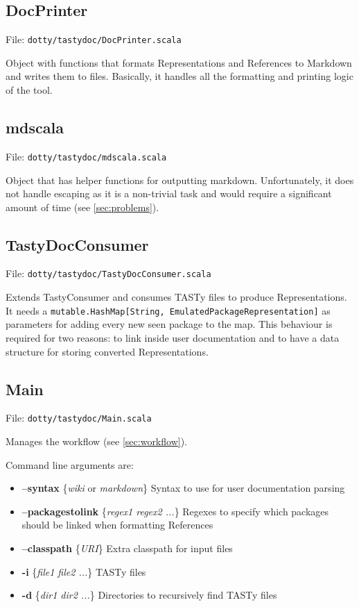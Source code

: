 \documentclass{report}
\begin{document}
\subsection{DocPrinter}
File: \texttt{dotty/tastydoc/DocPrinter.scala}

Object with functions that formats Representations and References to Markdown and writes them to files. Basically, it handles all the formatting and printing logic of the tool.

\subsection{mdscala}
File: \texttt{dotty/tastydoc/mdscala.scala}

Object that has helper functions for outputting markdown. Unfortunately, it does not handle escaping as it is a non-trivial task and would require a significant amount of time (see \autoref{sec:problems}).

\subsection{TastyDocConsumer}
File: \texttt{dotty/tastydoc/TastyDocConsumer.scala}

Extends TastyConsumer and consumes TASTy files to produce Representations. It needs a \texttt{mutable.HashMap[String, EmulatedPackageRepresentation]} as parameters for adding every new seen package to the map. This behaviour is required for two reasons: to link inside user documentation and to have a data structure for storing converted Representations.
\subsection{Main}
File: \texttt{dotty/tastydoc/Main.scala}

Manages the workflow (see \autoref{sec:workflow}).

Command line arguments are:
\begin{itemize}
    \item \textbf{--syntax} \{\textit{wiki} or \textit{markdown}\} Syntax to use for user documentation parsing
    \item \textbf{--packagestolink} \{\textit{regex1 regex2 ...}\} Regexes to specify which packages should be linked when formatting References
    \item \textbf{--classpath} \{\textit{URI}\} Extra classpath for input files
    \item \textbf{-i} \{\textit{file1 file2 ...}\} TASTy files
    \item \textbf{-d} \{\textit{dir1 dir2 ...}\} Directories to recursively find TASTy files
\end{itemize}
\end{document}
